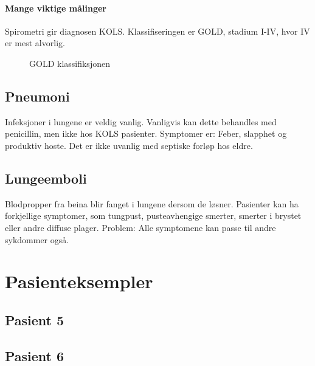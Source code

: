 				\paragraph{Mange viktige målinger\\}
					Spirometri gir diagnosen KOLS. Klassifiseringen er GOLD, stadium I-IV, hvor IV er mest alvorlig.
						\begin{figure}[ht]
                      \centering
                      \caption{GOLD klassifiksjonen}
                    \end{figure}
			\subsection{Pneumoni}
				Infeksjoner i lungene er veldig vanlig. Vanligvis kan dette behandles med penicillin, men ikke hos KOLS pasienter. Symptomer er: Feber, slapphet og produktiv hoste. Det er ikke uvanlig med septiske forløp hos eldre. 
			\subsection{Lungeemboli}
				Blodpropper fra beina blir fanget i lungene dersom de løsner. Pasienter kan ha forkjellige symptomer, som tungpust, pusteavhengige smerter, smerter i brystet eller andre diffuse plager. Problem: Alle symptomene kan passe til andre sykdommer også.
		\section{Pasienteksempler}
			\subsection{Pasient 5}
			\subsection{Pasient 6}